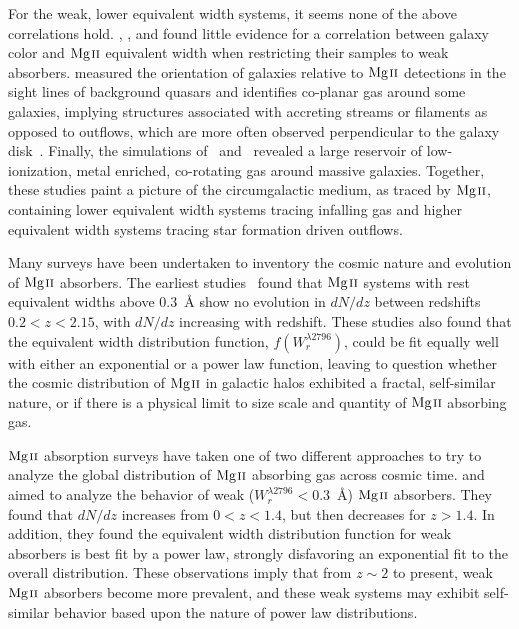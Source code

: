 \documentclass[iop,apj,numberedappendix,appendixfloats,twocolappendix]{emulateapj}
\begin{document}
For the weak, lower equivalent width systems, it seems none of the above correlations hold. \cite{Chen2010b}, \cite{Kacprzak2011}, and \cite{Lovegrove2011} found little evidence for a correlation between galaxy color and ${\hbox{{\rm Mg}\kern 0.1em{\sc ii}}}$ equivalent width when restricting their samples to weak absorbers. \cite{Kacprzak2011} measured the orientation of galaxies relative to ${\hbox{{\rm Mg}\kern 0.1em{\sc ii}}}$ detections in the sight lines of background quasars and identifies co-planar gas around some galaxies, implying structures associated with accreting streams or filaments as opposed to outflows, which are more often observed perpendicular to the galaxy disk~\citep{Bordoloi2011,Kacprzak2012-PA}. Finally, the simulations of~\cite{Stewart2011} and~\cite{Ford2013mass} revealed a large reservoir of low-ionization, metal enriched, co-rotating gas around massive galaxies. Together, these studies paint a picture of the circumgalactic medium, as traced by ${\hbox{{\rm Mg}\kern 0.1em{\sc ii}}}$, containing lower equivalent width systems tracing infalling gas and higher equivalent width systems tracing star formation driven outflows.

Many surveys have been undertaken to inventory the cosmic nature and evolution of ${\hbox{{\rm Mg}\kern 0.1em{\sc ii}}}$ absorbers. The earliest studies~\citep{Lanzetta1987,Tytler1987,Sargent1988,Steidel1992} found that ${\hbox{{\rm Mg}\kern 0.1em{\sc ii}}}$ systems with rest equivalent widths above $0.3$~{\AA} show no evolution in $dN\!/dz$ between redshifts $0.2 < z < 2.15$, with $dN\!/dz$ increasing with redshift. These studies also found that the equivalent width distribution function, $f(W_r^{\lambda2796})$, could be fit equally well with either an exponential or a power law function, leaving to question whether the cosmic distribution of ${\hbox{{\rm Mg}\kern 0.1em{\sc ii}}}$ in galactic halos exhibited a fractal, self-similar nature, or if there is a physical limit to size scale and quantity of ${\hbox{{\rm Mg}\kern 0.1em{\sc ii}}}$ absorbing gas. 

${\hbox{{\rm Mg}\kern 0.1em{\sc ii}}}$ absorption surveys have taken one of two different approaches to try to analyze the global distribution of ${\hbox{{\rm Mg}\kern 0.1em{\sc ii}}}$ absorbing gas across cosmic time. \cite{Churchill1999} and \cite{Narayanan2007} aimed to analyze the behavior of weak ($W_r^{\lambda2796} < 0.3$~{\AA}) ${\hbox{{\rm Mg}\kern 0.1em{\sc ii}}}$ absorbers. They found that $dN\!/dz$ increases from $0 < z < 1.4$, but then decreases for $z > 1.4$. In addition, they found the equivalent width distribution function for weak absorbers is best fit by a power law, strongly disfavoring an exponential fit to the overall distribution. These observations imply that from $z \sim 2$ to present, weak ${\hbox{{\rm Mg}\kern 0.1em{\sc ii}}}$ absorbers become more prevalent, and these weak systems may exhibit self-similar behavior based upon the nature of power law distributions. 
\end{document}
